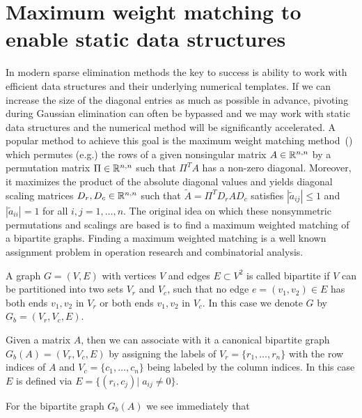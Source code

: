 \section{Maximum weight matching to enable static data structures}
\label{sec:mwm}
In modern sparse elimination methods the key to success 
is ability to work with efficient data structures and their underlying
numerical templates. If we can increase the size of the diagonal entries
as much as possible in advance, pivoting during Gaussian elimination can often 
be bypassed and we may work with static data structures and
the numerical method will be significantly accelerated. 
A popular method to achieve this goal is the
maximum weight matching method~(\cite{DufK99S,olschowka:1996})
which permutes (e.g.) the rows of a given
nonsingular matrix $A\in\mathbb{R}^{n,n}$ by a permutation matrix $\Pi\in\mathbb{R}^{n,n}$ 
such that $\Pi^TA$
has a non-zero diagonal. Moreover, it maximizes
the product of the absolute diagonal values  and yields diagonal
scaling matrices $D_r, D_c\in\mathbb{R}^{n,n}$ such that $\tilde A=\Pi^TD_rAD_c$ satisfies
$|\tilde a_{ij}|\leqslant 1$ and $|\tilde a_{ii}|=1$ for all $i,j=1,\dots,n$.
The original idea on which these nonsymmetric permutations and scalings are
based is to find a maximum weighted matching of a
bipartite graphs. Finding a maximum weighted matching is a well
known assignment problem in operation research and combinatorial
analysis.
\begin{definition}\label{def:bipartite}
A graph $G=(V,E)$ with vertices $V$ and edges $E\subset V^2$ 
is called bipartite
if $V$ can be partitioned into two sets  $V_r$ and  $V_c$, such that no edge
$e=(v_1,v_2) \in E$ has both ends $v_1,v_2$ in $V_r$ or both ends $v_1,v_2$ 
in $V_c$. In this case we denote $G$ by $G_b=(V_r,V_c,E)$.
\end{definition}
\begin{definition}\label{def:bipartite-graph}
Given a matrix $A$, then we can associate with it a canonical
bipartite graph $G_b(A)=(V_r,V_c,E)$ by assigning the 
labels of $V_r=\{r_1,\dots,r_n\}$ 
with the row indices of $A$ and 
$V_c=\{c_1,\dots,c_n\}$ being labeled by the column indices.
In this case $E$ is defined via $E=\{(r_i,c_j)|\; a_{ij}\not=0\}$.
\end{definition}
For the bipartite graph $G_b(A)$ we see immediately that 
